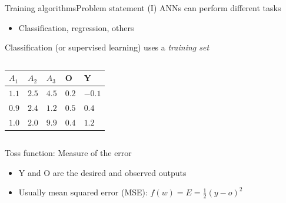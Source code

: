 \documentclass[10pt,compress]{beamer} %
\begin{document}
\begin{frame}{Training algorithms}{Problem statement (I)}
    ANNs can perform different tasks
    \begin{itemize}
        \item Classification, regression, others
    \end{itemize}
    Classification (or supervised learning) uses a \textit{training set}

	\begin{columns}[c]
            

            \begin{table}[]
            \centering
            \begin{tabular}{lll|l|l}\hline
              $A_1$ & $A_2$ & $A_3$ & O & Y \\
               \hline
              $1.1$ & $2.5$ & $4.5$ & $0.2$ & $-0.1$   \\
              $0.9$ & $2.4$ & $1.2$ & $0.5$ & $0.4$  \\
              $1.0$ & $2.0$ & $9.9$ & $0.4$ & $1.2$ \\\hline
            \end{tabular}
            \end{table}
    \end{columns}
    Toss function: Measure of the error
        \begin{itemize}
        	\item Y and O are the desired and observed outputs
		\item Usually mean squared error (MSE): $f(w) = E = \frac{1}{2} (y-o)^2$
        \end{itemize}
\end{frame}
\end{document}
